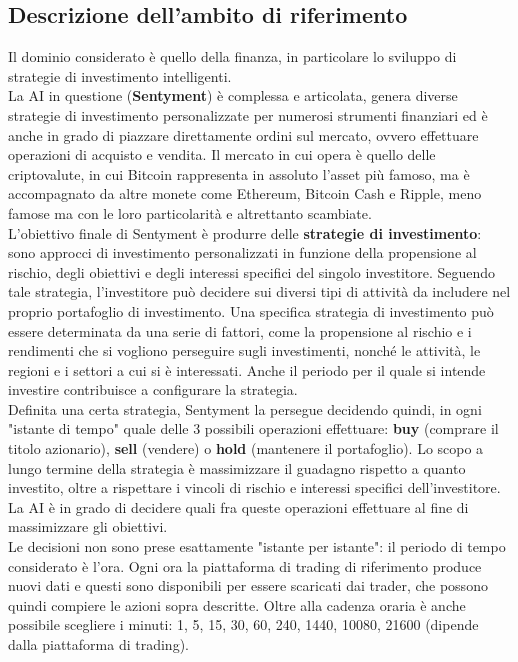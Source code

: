 \documentclass{article}
\begin{document}
	\subsection{Descrizione dell'ambito di riferimento}
		Il dominio considerato è quello della finanza, in particolare lo sviluppo di strategie di investimento intelligenti.\\
		La AI in questione (\textbf{Sentyment}) è complessa e articolata, genera diverse strategie di investimento personalizzate per numerosi strumenti finanziari ed è anche in grado di piazzare direttamente ordini sul mercato, ovvero effettuare operazioni di acquisto e vendita. Il mercato in cui opera è quello delle criptovalute, in cui Bitcoin rappresenta in assoluto l'asset più famoso, ma è accompagnato da altre monete come Ethereum, Bitcoin Cash e Ripple, meno famose ma con le loro particolarità e altrettanto scambiate.\\
		L'obiettivo finale di Sentyment è produrre delle \textbf{strategie di investimento}: sono approcci di investimento personalizzati in funzione della propensione al rischio, degli obiettivi e degli interessi specifici del singolo investitore. Seguendo tale strategia, l’investitore può decidere sui diversi tipi di attività da includere nel proprio portafoglio di investimento. Una specifica strategia di investimento può essere determinata da una serie di fattori, come la propensione al rischio e i rendimenti che si vogliono perseguire sugli investimenti, nonché le attività, le regioni e i settori a cui si è interessati. Anche il periodo per il quale si intende investire contribuisce a configurare la strategia.\\
		Definita una certa strategia, Sentyment la persegue decidendo quindi, in ogni "istante di tempo" quale delle 3 possibili operazioni effettuare: \textbf{buy} (comprare il titolo azionario), \textbf{sell} (vendere) o \textbf{hold} (mantenere il portafoglio). Lo scopo a lungo termine della strategia è massimizzare il guadagno rispetto a quanto investito, oltre a rispettare i vincoli di rischio e interessi specifici dell'investitore. La AI è in grado di decidere quali fra queste operazioni effettuare al fine di massimizzare gli obiettivi.\\
		Le decisioni non sono prese esattamente "istante per istante": il periodo di tempo considerato è l'ora. Ogni ora la piattaforma di trading di riferimento produce nuovi dati e questi sono disponibili per essere scaricati dai trader, che possono quindi compiere le azioni sopra descritte. Oltre alla cadenza oraria è anche possibile scegliere i minuti: 1, 5, 15, 30, 60, 240, 1440, 10080, 21600 (dipende dalla piattaforma di trading).\\
		
\end{document}
